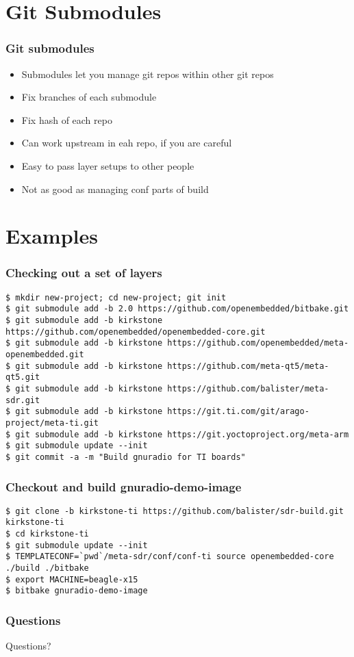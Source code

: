 \documentclass{beamer}
\begin{document}
\section{Git Submodules}

\begin{frame}
\frametitle{Git submodules}

\begin{itemize}
\item Submodules let you manage git repos within other git repos
\item Fix branches of each submodule
\item Fix hash of each repo
\item Can work upstream in eah repo, if you are careful
\item Easy to pass layer setups to other people
\item Not as good as managing conf parts of build
\end{itemize}

\end{frame}

\section{Examples}

\begin{frame}[fragile]
\frametitle{Checking out a set of layers}

\begin{Verbatim}[fontsize=\tiny]
$ mkdir new-project; cd new-project; git init
$ git submodule add -b 2.0 https://github.com/openembedded/bitbake.git
$ git submodule add -b kirkstone https://github.com/openembedded/openembedded-core.git
$ git submodule add -b kirkstone https://github.com/openembedded/meta-openembedded.git
$ git submodule add -b kirkstone https://github.com/meta-qt5/meta-qt5.git
$ git submodule add -b kirkstone https://github.com/balister/meta-sdr.git
$ git submodule add -b kirkstone https://git.ti.com/git/arago-project/meta-ti.git
$ git submodule add -b kirkstone https://git.yoctoproject.org/meta-arm
$ git submodule update --init
$ git commit -a -m "Build gnuradio for TI boards"
\end{Verbatim}

\end{frame}

\begin{frame}[fragile]
\frametitle{Checkout and build gnuradio-demo-image}

\begin{Verbatim}[fontsize=\tiny]
$ git clone -b kirkstone-ti https://github.com/balister/sdr-build.git kirkstone-ti
$ cd kirkstone-ti
$ git submodule update --init
$ TEMPLATECONF=`pwd`/meta-sdr/conf/conf-ti source openembedded-core ./build ./bitbake
$ export MACHINE=beagle-x15
$ bitbake gnuradio-demo-image
\end{Verbatim}

\end{frame}

\begin{frame}
\frametitle{Questions}

Questions?

\end{frame}
\end{document}
